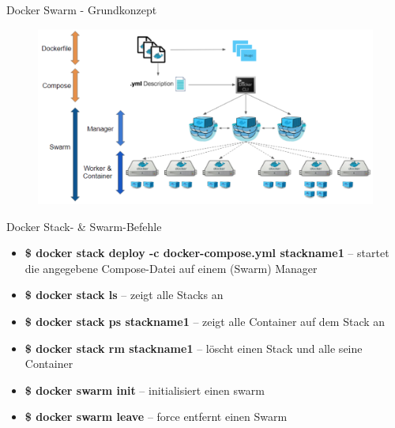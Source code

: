 \documentclass[final]{beamer}
\newlength{\onecolwid}
\newlength{\twocolwid}
\begin{document}
\begin{frame}
\begin{columns}[t]
\begin{column}{\twocolwid}
\begin{columns}[t,totalwidth=\twocolwid]
\begin{column}{\onecolwid}
\begin{block}{Docker Swarm - Grundkonzept}
\begin{figure}
	\includegraphics[scale=0.60]{gs}
\end{figure}


\end{block}

\begin{block}{Docker Stack- \& Swarm-Befehle}
\small
\begin{itemize}
	\item \textbf{\$ docker stack deploy -c docker-compose.yml stackname1} -- startet die angegebene Compose-Datei auf einem (Swarm) Manager
	\item \textbf{\$ docker stack ls} -- zeigt alle Stacks an
	\item \textbf{\$ docker stack ps stackname1} -- zeigt alle Container auf dem Stack an
	\item \textbf{\$ docker stack rm stackname1} -- löscht einen Stack und alle seine Container\end{itemize}
\begin{itemize}
\item \textbf{\$ docker swarm init} -- initialisiert einen swarm
\item \textbf{\$ docker swarm leave} -- force entfernt einen Swarm
\end{itemize}


\end{block}



\end{column} %

\end{columns} %





\end{column}
\end{columns}
\end{frame}
\end{document}
